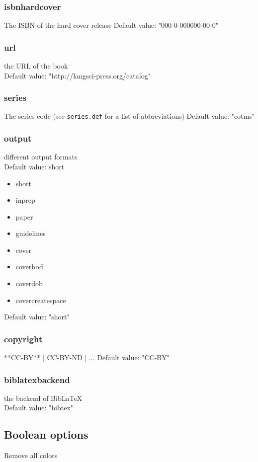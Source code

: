 \documentclass[guidelines]{langscibook}
\begin{document}
\subsubsection{isbnhardcover}
The ISBN of the hard cover release
Default value: "000-0-000000-00-0"
\subsubsection{url}
the URL of the book \\
Default value: "http://langsci-press.org/catalog"
\subsubsection{series}
The series code (see \texttt{series.def} for a list of abbreviations)
Default value: "eotms"
\subsubsection{output}
different output formats\\
Default value: short
\begin{itemize}
\item short
\item inprep
\item paper
\item guidelines
\item cover
\item coverbod
\item coverdob
\item covercreatespace 
\end{itemize}


Default value: "short"
\subsubsection{copyright}
**CC-BY** | CC-BY-ND | ...
Default value: "CC-BY"
\subsubsection{biblatexbackend}
the backend of BibLaTeX\\
Default value: "bibtex"

\subsection{Boolean options}
Remove all colors\\
\end{document}
